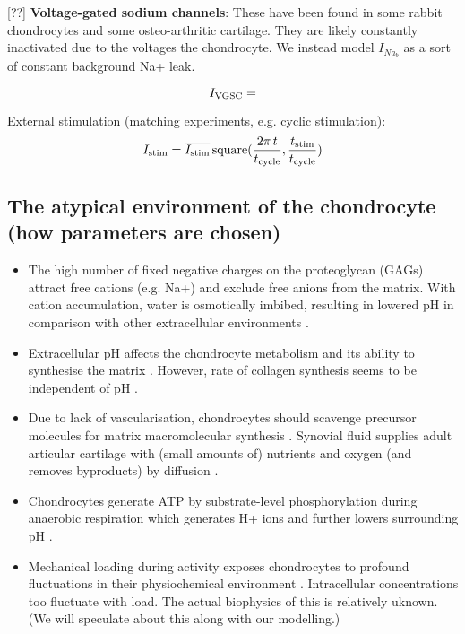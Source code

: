 [??] {\bf Voltage-gated sodium channels}: These have been found in
some rabbit chondrocytes and some osteo-arthritic cartilage. They are
likely constantly inactivated due to the voltages the
chondrocyte.  We instead model $I_{Na_{b}}$ as a sort of constant
background Na+ leak.


\begin{equation}
  I_{\rm VGSC} =
\end{equation}

External stimulation (matching experiments, e.g. cyclic stimulation):
\begin{equation}
I_{\rm stim} = \overline{I_{\rm stim}}\, {\rm square}(\frac{2 \pi\,
  t}{t_{\rm cycle}}, \frac{t_{\rm stim}}{t_{\rm cycle}})
\end{equation}

\subsection*{The atypical environment of the chondrocyte (how
  parameters are chosen)}
\label{sec:chondrocyte-environment}


\begin{itemize}
  \item The high number of fixed negative charges on the proteoglycan
    (GAGs) attract free cations (e.g. Na+) and exclude free anions from
    the matrix. With cation accumulation, water is osmotically imbibed,
    resulting in lowered pH in comparison with other extracellular
    environments \citep{Wilkinsetal2000, LeeUrban1997}.
  \item Extracellular pH affects the chondrocyte metabolism and its
    ability to synthesise the matrix
    \citep{BarrettJolleyetal2010}. However, rate of collagen
    synthesis seems to be independent of pH \citep{Wuetal2007}.
  \item Due to lack of vascularisation, chondrocytes should scavenge
    precursor molecules for matrix macromolecular synthesis
    \citep{Holmetal1998, Stockwell1991}. Synovial fluid supplies adult
    articular cartilage with (small amounts of) nutrients and oxygen
    (and removes byproducts) by diffusion \citep{LeeUrban1997,
      Otte1991}.
  \item Chondrocytes generate ATP by substrate-level phosphorylation
    during anaerobic respiration which generates H+ ions and further
    lowers surrounding pH \citep{LeeUrban1997}.
  \item Mechanical loading during activity exposes chondrocytes to
    profound fluctuations in their physiochemical environment
    \citep{Mowetal1999, Urban1994}.
    Intracellular concentrations too fluctuate with load. The actual
    biophysics of this is relatively uknown. (We will speculate about
    this along with our modelling.)
\end{itemize}

